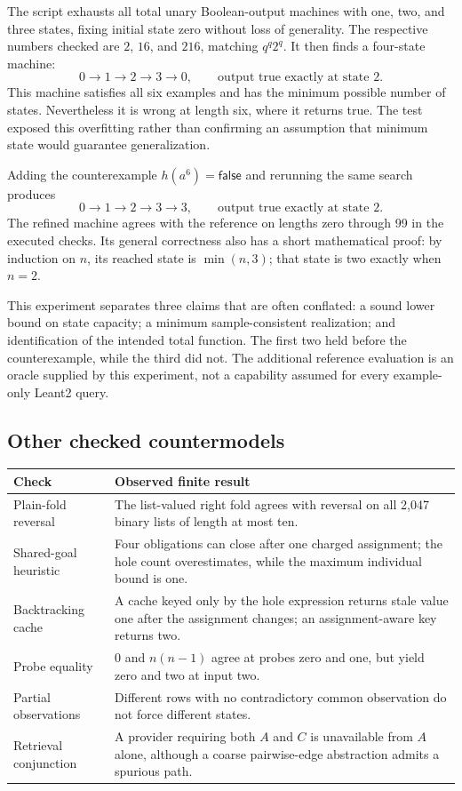 \documentclass[11pt,a4paper]{article}
\theoremstyle{remark}
\begin{document}
The script exhausts all total unary Boolean-output machines with one, two, and three states, fixing initial state zero without loss of generality. The respective numbers checked are $2$, $16$, and $216$, matching $q^q2^q$. It then finds a four-state machine:
\[
 0\to1\to2\to3\to0,
 \qquad\text{output true exactly at state }2.
\]
This machine satisfies all six examples and has the minimum possible number of states. Nevertheless it is wrong at length six, where it returns true. The test exposed this overfitting rather than confirming an assumption that minimum state would guarantee generalization.

Adding the counterexample $h(a^6)=\mathsf{false}$ and rerunning the same search produces
\[
 0\to1\to2\to3\to3,
 \qquad\text{output true exactly at state }2.
\]
The refined machine agrees with the reference on lengths zero through 99 in the executed checks. Its general correctness also has a short mathematical proof: by induction on $n$, its reached state is $\min(n,3)$; that state is two exactly when $n=2$.

This experiment separates three claims that are often conflated: a sound lower bound on state capacity; a minimum sample-consistent realization; and identification of the intended total function. The first two held before the counterexample, while the third did not. The additional reference evaluation is an oracle supplied by this experiment, not a capability assumed for every example-only Leant2 query.

\subsection{Other checked countermodels}

\begin{center}
\begin{tabularx}{\textwidth}{@{}P{37mm}Y@{}}
\toprule
Check & Observed finite result\\
\midrule
Plain-fold reversal & The list-valued right fold agrees with reversal on all 2,047 binary lists of length at most ten.\\
Shared-goal heuristic & Four obligations can close after one charged assignment; the hole count overestimates, while the maximum individual bound is one.\\
Backtracking cache & A cache keyed only by the hole expression returns stale value one after the assignment changes; an assignment-aware key returns two.\\
Probe equality & $0$ and $n(n-1)$ agree at probes zero and one, but yield zero and two at input two.\\
Partial observations & Different rows with no contradictory common observation do not force different states.\\
Retrieval conjunction & A provider requiring both $A$ and $C$ is unavailable from $A$ alone, although a coarse pairwise-edge abstraction admits a spurious path.\\
\bottomrule
\end{tabularx}
\end{center}
\end{document}

